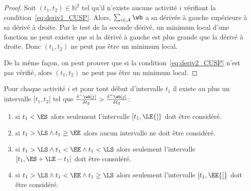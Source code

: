 \begin{proof}
Soit $(t_1,t_2) \in \mathbb{N}^2$ tel qu'il n'existe aucune activité
$i$ vérifiant la condition~\eqref{eq:deriv1_CUSP}. Alors, $\sum_{i \in
  \A} \wb$ a sa dérivée à gauche supérieure à sa dérivé à droite. Par
le test de la seconde dérivé, un minimum local d'une fonction ne peut
exister que si la dérivé à gauche est plus grande que la dérivé à
droite. Donc $(t_1,t_2)$ ne peut pas être un minimum local. 

De la même façon, on peut prouver que si la
condition~\eqref{eq:deriv2_CUSP} n'est pas vérifié, alors $(t_1,t_2)$
ne peut pas être un minimum local. 
\end{proof}


\begin{lemma}
  Pour chaque activité $i$ et pour tout début d'intervalle $t_1$ il
  existe au plus un intervalle $[t_1,t_2[$ tel que
  $\frac{\delta^{-}\wb[j]}{\delta t_2} >
  \frac{\delta^{+}\wb[j]}{\delta t_2} $:
  \begin{enumerate}
  \item si $t_1 < \ES$ alors seulement l'intervalle $[t_1,\LE {[}$ doit
    être considéré.
  \item si $t_1  > \LS \land t_1 \ge \EE$ alors aucun intervalle ne
    doit être considéré. 
  \item si $t_1  > \LS \land t_1 <\EE \land t_1 < \LS$ alors seulement
    l'intervalle $[t_1,\ES+\LE-t_1 [$ doit
    être considéré.
  \item si $t_1  > \LS \land t_1 <\EE \land t_1 \ge \LS$ alors
    seulement l'intervalle $[t_1,\EE {[}$ doit
    être considéré.
  \end{enumerate}
\end{lemma}


